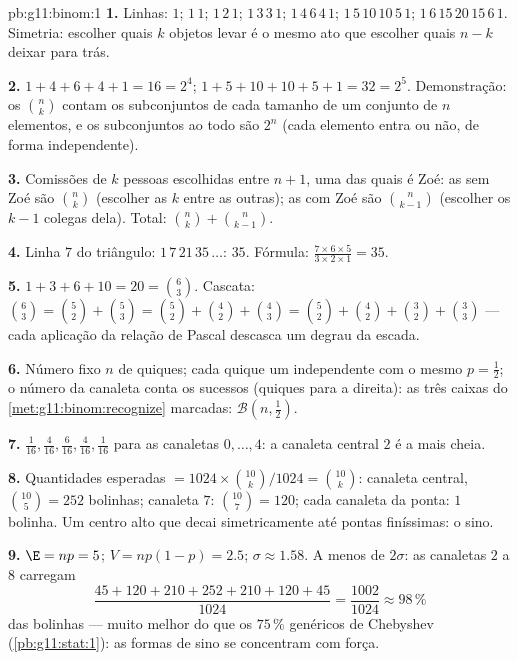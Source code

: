 \begin{solution}{pb:g11:binom:1}
\textbf{1.} Linhas: $1$; $1\,1$; $1\,2\,1$; $1\,3\,3\,1$;
$1\,4\,6\,4\,1$; $1\,5\,10\,10\,5\,1$;
$1\,6\,15\,20\,15\,6\,1$. Simetria: escolher quais $k$ objetos
levar é o mesmo ato que escolher quais $n - k$ deixar para
trás.

\textbf{2.} $1 + 4 + 6 + 4 + 1 = 16 = 2^4$;
$1 + 5 + 10 + 10 + 5 + 1 = 32 = 2^5$. Demonstração: os
$\binom nk$ contam os subconjuntos de cada tamanho de um
conjunto de $n$ elementos, e os subconjuntos ao todo são $2^n$
(cada elemento entra ou não, de forma independente).

\textbf{3.} Comissões de $k$ pessoas escolhidas entre $n + 1$,
uma das quais é Zoé: as sem Zoé são $\binom nk$ (escolher as
$k$ entre as outras); as com Zoé são $\binom{n}{k-1}$
(escolher os $k - 1$ colegas dela). Total:
$\binom nk + \binom{n}{k-1}$.

\textbf{4.} Linha $7$ do triângulo: $1\,7\,21\,35\,\dots$: $35$.
Fórmula: $\frac{7 \times 6 \times 5}{3 \times 2 \times 1} =
35$.

\textbf{5.} $1 + 3 + 6 + 10 = 20 = \binom63$. Cascata:
$\binom63 = \binom52 + \binom53 = \binom52 + \binom42 +
\binom43 = \binom52 + \binom42 + \binom32 + \binom33$ --- cada
aplicação da relação de Pascal descasca um degrau da escada.

\textbf{6.} Número fixo $n$ de quiques; cada quique um  independente com o mesmo $p = \frac12$; o número da
canaleta conta os sucessos (quiques para a direita): as três
caixas do \cref{met:g11:binom:recognize} marcadas:
$\mathcal B\!\left(n, \frac12\right)$.

\textbf{7.}  $\frac{1}{16}, \frac{4}{16},
\frac{6}{16}, \frac{4}{16}, \frac{1}{16}$ para as canaletas
$0, \dots, 4$: a canaleta central $2$ é a mais cheia.

\textbf{8.} Quantidades esperadas $= 1024 \times
\binom{10}{k}/1024 = \binom{10}{k}$: canaleta central,
$\binom{10}{5} = 252$ bolinhas; canaleta $7$:
$\binom{10}{7} = 120$; cada canaleta da ponta: $1$ bolinha. Um
centro alto que decai simetricamente até pontas finíssimas: o
sino.

\textbf{9.} $\E = np = 5$; $V = np(1 - p) = 2.5$;
$\sigma \approx 1.58$. A menos de $2\sigma$: as canaletas $2$ a
$8$ carregam
\[
\frac{45 + 120 + 210 + 252 + 210 + 120 + 45}{1024}
= \frac{1002}{1024} \approx 98\,\%
\]
das bolinhas --- muito melhor do que os $75\,\%$ genéricos de
Chebyshev (\cref{pb:g11:stat:1}): as formas de sino se
concentram com força.


\end{solution}
